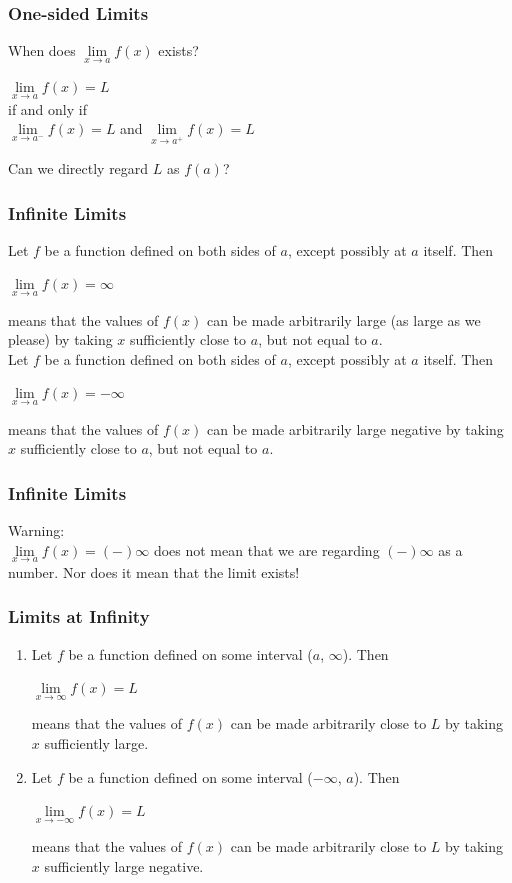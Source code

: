 \documentclass{beamer}
\begin{document}
	\begin{frame}
		\frametitle{One-sided Limits}
		When does $\lim\limits_{\textit{x} \to a}f(x)$ exists?\\
		\bigskip
		\begin{center}
			$\lim\limits_{\textit{x} \to a}f(x) = L$\\
			\bigskip
			\alert{if and only if}\\
			\bigskip
			$\lim\limits_{\textit{x} \to a^{-}}f(x) = L$ and $\lim\limits_{\textit{x} \to a^{+}}f(x) = L$
		\end{center}
		Can we directly regard $L$ as $f(a)$?
	\end{frame}
	\begin{frame}

		\frametitle{Infinite Limits}
		Let $f$ be a function defined on both sides of $a$, \alert{except possibly} at $a$ itself. Then
		\begin{center}
			$\lim\limits_{\textit{x} \to a}f(x) = \infty$
		\end{center}
		means that the values of $f(x)$ can be made arbitrarily large (as large as we please) by taking $x$ \alert{sufficiently close to} $a$, but \alert{not equal to} $a$.\\
		
		Let $f$ be a function defined on both sides of $a$, \alert{except possibly} at $a$ itself. Then
		\begin{center}
			$\lim\limits_{\textit{x} \to a}f(x) = -\infty$
		\end{center}
		means that the values of $f(x)$ can be made arbitrarily large negative by taking $x$ \alert{sufficiently close to} $a$, but \alert{not equal to} $a$.
	\end{frame}
	\begin{frame}
		\frametitle{Infinite Limits}
		\alert{Warning:}\\
		$\lim\limits_{\textit{x} \to a}f(x) = (-)\infty$ does not mean that we are regarding $(-)\infty$ as a number. Nor does it mean that the limit exists!
	\end{frame}
	\begin{frame}
		\frametitle{Limits at Infinity}
		\begin{enumerate}
			\item Let $f$ be a function defined on some interval ($a$, $\infty$). Then
			\begin{center}
				$\lim\limits_{\textit{x} \to \infty}f(x) = L$
			\end{center}
			means that the values of $f(x)$ can be made arbitrarily close to $L$ by taking $x$ sufficiently large.
		\item Let $f$ be a function defined on some interval ($-\infty$, $a$). Then
			\begin{center}
				$\lim\limits_{\textit{x} \to -\infty}f(x) = L$
			\end{center}
			means that the values of $f(x)$ can be made arbitrarily close to $L$ by taking $x$ sufficiently large negative.
		\end{enumerate}
	\end{frame}
\end{document}
